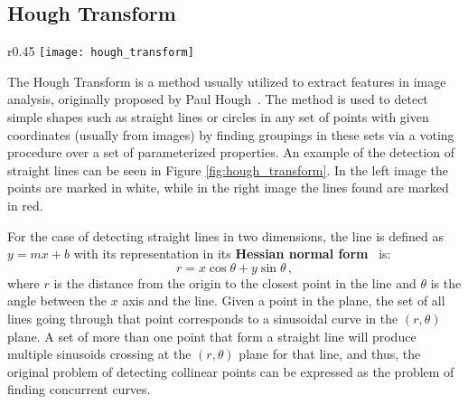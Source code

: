 \subsection{Hough Transform} \label{add:hough_transform}

    \begin{wrapfigure}{r}{0.45\textwidth}
        \centering
        \texttt{[image: hough\_transform]}
        \caption{\label{fig:hough_transform} Hough transform example. The red lines on the right image denote the lines found by the method.}
    \end{wrapfigure}

The Hough Transform is a method usually utilized to extract features in image analysis, originally proposed by Paul Hough~\cite{hough1962method}.
The method is used to detect simple shapes such as straight lines or circles in any set of points with given coordinates (usually from images) by finding groupings in these sets via a voting procedure over a set of parameterized properties.
An example of the detection of straight lines can be seen in Figure \ref{fig:hough_transform}.
In the left image the points are marked in white, while in the right image the lines found are marked in red.

For the case of detecting straight lines in two dimensions, the line is defined as $y = mx + b$ with its representation in its \textbf{Hessian normal form}~\cite{gellert2012vnr} is:
    \begin{equation*}
        r = x\cos{\theta} + y\sin{\theta}\,,
    \end{equation*}
where $r$ is the distance from the origin to the closest point in the line and $\theta$ is the angle between the $x$ axis and the line.
Given a point in the plane, the set of all lines going through that point corresponds to a sinusoidal curve in the $(r,\theta)$ plane.
A set of more than one point that form a straight line will produce multiple sinusoids crossing at the $(r,\theta)$ plane for that line, and thus, the original problem of detecting collinear points can be expressed as the problem of finding concurrent curves.